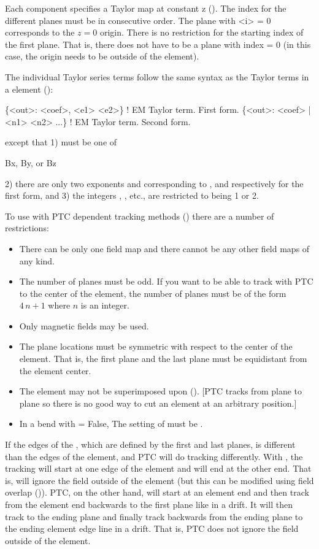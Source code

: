 Each  component specifies a Taylor map at constant z
(). The index  for the different planes must be in
consecutive order. The plane with <i> = 0 corresponds to the $z = 0$ origin. There is no
restriction for the starting  index of the first plane. That is, there does not
have to be a plane with index  = 0 (in this case, the origin needs to be outside
of the element).

The individual Taylor series terms follow the same syntax as the Taylor terms in a
 element ():
\begin{example}
  \{<out>: <coef>, <e1> <e2>\}           ! EM Taylor term. First form.
  \{<out>: <coef> | <n1> <n2> ...\}      ! EM Taylor term. Second form.
\end{example}
except that 1)  must be one of
\begin{example}
  Bx, By, or Bz
\end{example}
2) there are only two exponents  and 
corresponding to , and  respectively for the first form,  and 3) the integers
, , etc., are restricted to being 1 or 2.

To use with PTC dependent tracking methods () there are a number of
restrictions: 
  \begin{itemize}
  \item
There can be only one  field map and there cannot be any other field
maps of any kind.
  \item 
The number of planes must be odd. If you want to be able to track with PTC to the center of the
element, the number of planes must be of the form $4 \, n + 1$ where $n$ is an integer.
  \item
Only magnetic fields may be used.
  \item
The plane locations must be symmetric with respect to the center of the element. That is,
the first plane and the last plane must be equidistant from the element center.
  \item
The element may not be superimposed upon (). [PTC tracks from plane to plane
so there is no good way to cut an element at an arbitrary position.]
  \item
In a bend with  = False, The setting of  must be
.
  \end{itemize}
If the edges of the , which are defined by the first and last planes, is different
than the edges of the element, \bmad and PTC will do tracking differently. With \bmad, the tracking
will start at one edge of the element and will end at the other end. That is, \bmad will ignore the
field outside of the element (but this can be modified using field overlap ()). PTC,
on the other hand, will start at an element end and then track from the element end backwards to the
first plane like in a drift. It will then track to the ending plane and finally track backwards from
the ending plane to the ending element edge line in a drift. That is, PTC does not ignore the field
outside of the element.

